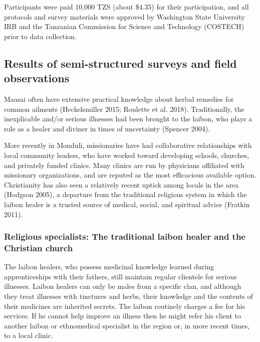 \documentclass[
  11pt,
]{article}
\begin{document}
Participants were paid 10,000 TZS (about \$4.35) for their participation, and all protocols and survey materials were approved by Washington State University IRB and the Tanzanian Commission for Science and Technology (COSTECH) prior to data collection.

\hypertarget{results-of-semi-structured-surveys-and-field-observations}{%
\subsection{Results of semi-structured surveys and field observations}\label{results-of-semi-structured-surveys-and-field-observations}}

Maasai often have extensive practical knowledge about herbal remedies for common ailments (Heckelsmiller 2015; Roulette et al. 2018). Traditionally, the inexplicable and/or serious illnesses had been brought to the laibon, who plays a role as a healer and diviner in times of uncertainty (Spencer 2004).

More recently in Monduli, missionaries have had collaborative relationships with local community leaders, who have worked toward developing schools, churches, and privately funded clinics. Many clinics are run by physicians affiliated with missionary organizations, and are reputed as the most efficacious available option. Christianity has also seen a relatively recent uptick among locals in the area (Hodgson 2005), a departure from the traditional religious system in which the laibon healer is a trusted source of medical, social, and spiritual advice (Fratkin 2011).

\hypertarget{religious-specialists-the-traditional-laibon-healer-and-the-christian-church}{%
\subsubsection{Religious specialists: The traditional laibon healer and the Christian church}\label{religious-specialists-the-traditional-laibon-healer-and-the-christian-church}}

The laibon healers, who possess medicinal knowledge learned during apprenticeships with their fathers, still maintain regular clientele for serious illnesses. Laibon healers can only be males from a specific clan, and although they treat illnesses with tinctures and herbs, their knowledge and the contents of their medicines are inherited secrets. The laibon routinely charges a fee for his services. If he cannot help improve an illness then he might refer his client to another laibon or ethnomedical specialist in the region or, in more recent times, to a local clinic.
\end{document}
